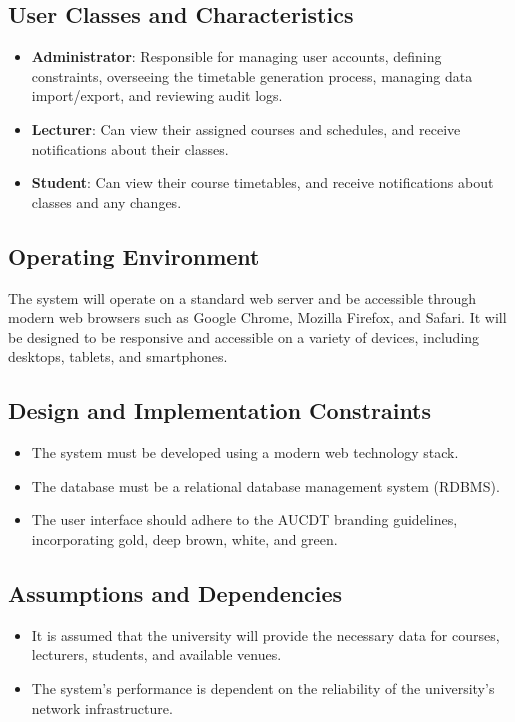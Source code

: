 \documentclass[11pt, a4paper]{article}
\begin{document}
\subsection{User Classes and Characteristics}
\label{sec:user_classes}
\begin{itemize}
    \item \textbf{Administrator}: Responsible for managing user accounts, defining constraints, overseeing the timetable generation process, managing data import/export, and reviewing audit logs.
    \item \textbf{Lecturer}: Can view their assigned courses and schedules, and receive notifications about their classes.
    \item \textbf{Student}: Can view their course timetables, and receive notifications about classes and any changes.
\end{itemize}

\subsection{Operating Environment}
\label{sec:environment}
The system will operate on a standard web server and be accessible through modern web browsers such as Google Chrome, Mozilla Firefox, and Safari. It will be designed to be responsive and accessible on a variety of devices, including desktops, tablets, and smartphones.

\subsection{Design and Implementation Constraints}
\label{sec:constraints}
\begin{itemize}
    \item The system must be developed using a modern web technology stack.
    \item The database must be a relational database management system (RDBMS).
    \item The user interface should adhere to the AUCDT branding guidelines, incorporating gold, deep brown, white, and green.
\end{itemize}

\subsection{Assumptions and Dependencies}
\label{sec:assumptions}
\begin{itemize}
    \item It is assumed that the university will provide the necessary data for courses, lecturers, students, and available venues.
    \item The system's performance is dependent on the reliability of the university's network infrastructure.
\end{itemize}
\end{document}

